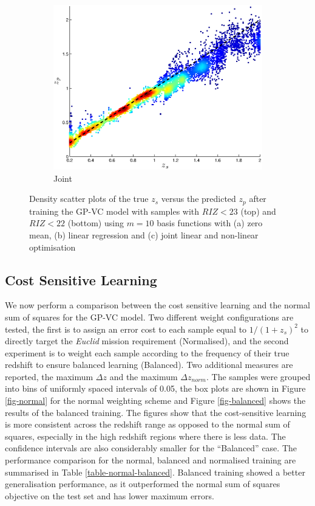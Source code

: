 \documentclass[useAMS,usenatbib,fleqn]{mn2e}
\begin{document}
\begin{figure}
\begin{subfigure}[b]{0.3\textwidth}
                \includegraphics[width=\textwidth]{figures/22_J.eps}
                \caption{Joint}
        \end{subfigure}
        
        \caption{Density scatter plots of the true $z_{s}$ versus the predicted $z_{p}$ after training the GP-VC model with samples with $RIZ<23$ (top) and $RIZ<22$ (bottom) using $m=10$ basis functions with (a) zero mean, (b) linear regression and (c) joint linear and non-linear optimisation}
        \label{fig-RIZ-splits}
\end{figure}


\subsection{Cost Sensitive Learning}
We now perform a comparison between the cost sensitive learning and the normal sum of squares for the GP-VC model. Two different weight configurations are tested, the first is to assign an error cost to each sample equal to $1/\left(1+z_{s}\right)^{2}$ to directly target the {\em Euclid} mission requirement (Normalised), and the second experiment is to weight each sample according to the frequency of their true redshift to ensure balanced learning (Balanced).  Two additional measures are reported, the maximum $\Delta z$ and the maximum $\Delta z_{norm}$. The samples were grouped into bins of uniformly spaced intervals of 0.05, the box plots are shown in Figure \ref{fig-normal} for the normal weighting scheme and Figure \ref{fig-balanced} shows the results of the balanced training. The figures show that the cost-sensitive learning is more consistent across the redshift range as opposed to the normal sum of squares, especially in the high redshift regions where there is less data. The confidence intervals are also considerably smaller for the ``Balanced'' case. The performance comparison for the normal, balanced and normalised training are summarised in Table \ref{table-normal-balanced}. Balanced training showed a better generalisation performance, as it outperformed the normal sum of squares objective on the test set and has lower maximum errors.
\end{document}
